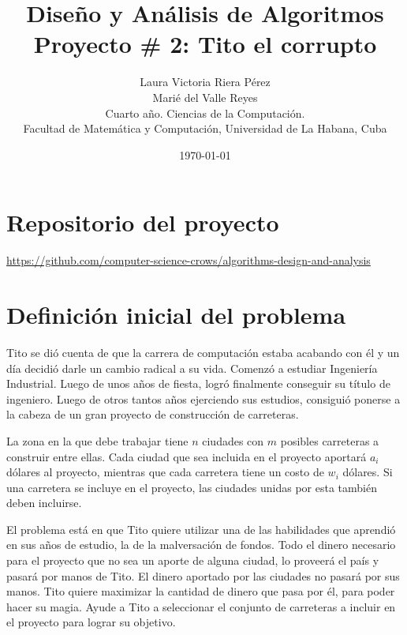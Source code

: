 \documentclass[10pt]{article} %
\title{\normalsize{Dise\~no y An\'alisis de Algoritmos }\\
	\Huge\bfseries Proyecto \# 2: Tito el corrupto \\
} %
\author{%
	Laura Victoria Riera P\'erez\\
	Mari\'e del Valle Reyes \vspace{1em} \\
	\small Cuarto a\~no. Ciencias de la Computaci\'on. \\ %
	\small Facultad de Matem\'atica y Computaci\'on, Universidad de La Habana, Cuba \\ %
}
\date{\footnotesize \today } %
\begin{document}
	\maketitle
	
	
	\section{Repositorio del proyecto}
	
	\begin{center}
		\href{https://github.com/computer-science-crows/algorithms-design-and-analysis}{https://github.com/computer-science-crows/algorithms-design-and-analysis}
	\end{center}

	\section{Definici\'on inicial del problema} 

	Tito se dió cuenta de que la carrera de computación estaba acabando con él y un día decidió darle un cambio radical a su vida. Comenzó a estudiar Ingeniería Industrial. Luego de unos años de fiesta, logró finalmente conseguir su título de ingeniero. Luego de otros tantos años ejerciendo sus estudios, consiguió ponerse a la cabeza de un gran proyecto de construcción de carreteras.
	
	La zona en la que debe trabajar tiene $n$ ciudades con $m$ posibles carreteras a construir entre ellas. Cada ciudad que sea incluida en el proyecto aportará $a_i$ dólares al proyecto, mientras que cada carretera tiene un costo de $w_i$ dólares. Si una carretera se incluye en el proyecto, las ciudades unidas por esta también deben incluirse.
	
	El problema está en que Tito quiere utilizar una de las habilidades que aprendió en sus años de estudio, la de la malversación de fondos. Todo el dinero necesario para el proyecto que no sea un aporte de alguna ciudad, lo proveerá el país y pasará por manos de Tito. El dinero aportado por las ciudades no pasará por sus manos. Tito quiere maximizar la cantidad de dinero que pasa por él, para poder hacer su magia. Ayude a Tito a seleccionar el conjunto de carreteras a incluir en el proyecto para lograr su objetivo.
	
\end{document}
